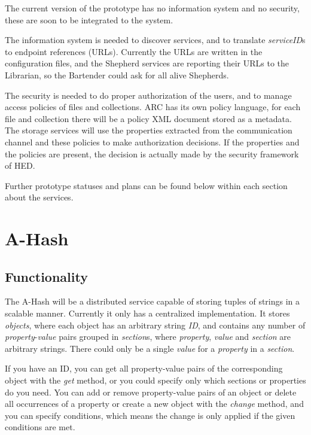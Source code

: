 \documentclass{book}
\begin{document}
The current version of the prototype has no information system and no security, these are soon to be integrated to the system.

The information system is needed to discover services, and to translate \emph{serviceID}s to endpoint references (URLs). Currently the URLs are written in the configuration files, and the Shepherd services are reporting their URLs to the Librarian, so the Bartender could ask for all alive Shepherds.

The security is needed to do proper authorization of the users, and to manage access policies of files and collections. ARC has its own policy language, for each file and collection there will be a policy XML document stored as a metadata. The storage services will use the properties extracted from the communication channel and these policies to make authorization decisions. If the properties and the policies are present, the decision is actually made by the security framework of HED.

Further prototype statuses and plans can be found below within each section about the services.

\newpage

\section{A-Hash} %
\label{sec:a_hash}

\subsection{Functionality} %

The A-Hash will be a distributed service capable of storing tuples of strings in a scalable manner. Currently it only has a centralized implementation. It stores \emph{objects}, where each object has an arbitrary string \emph{ID}, and contains any number of \emph{property}-\emph{value} pairs grouped in \emph{section}s, where \emph{property}, \emph{value} and \emph{section} are arbitrary strings. There could only be a single \emph{value} for a \emph{property} in a \emph{section}.

If you have an ID, you can get all property-value pairs of the corresponding object with the \emph{get} method, or you could specify only which sections or properties do you need. You can add or remove property-value pairs of an object or delete all occurrences of a property or create a new object with the \emph{change} method, and you can specify conditions, which means the change is only applied if the given conditions are met.
\end{document}
